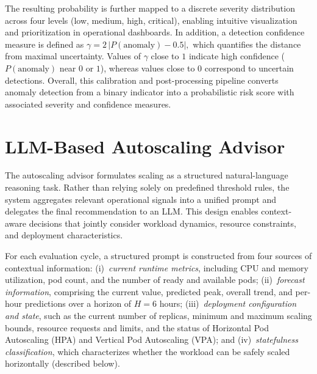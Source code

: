 \documentclass[sigconf]{acmart}
\begin{document}
The resulting probability is further mapped to a discrete severity distribution across four levels (low, medium, high, critical), enabling intuitive visualization and prioritization in operational dashboards.
In addition, a detection confidence measure is defined as $\gamma = 2\,\bigl|P(\text{anomaly}) - 0.5\bigr|,$
which quantifies the distance from maximal uncertainty. Values of $\gamma$ close to $1$ indicate high confidence ($P(\text{anomaly})$ near $0$ or $1$), whereas values close to $0$ correspond to uncertain detections.
%
Overall, this calibration and post-processing pipeline converts anomaly detection from a binary indicator into a probabilistic risk score with associated severity and confidence measures.

\section{LLM-Based Autoscaling Advisor}
\label{sec:llm}

The autoscaling advisor formulates scaling as a structured natural-language reasoning task. Rather than relying solely on predefined threshold rules, the system aggregates relevant operational signals into a unified prompt and delegates the final recommendation to an LLM. This design enables context-aware decisions that jointly consider workload dynamics, resource constraints, and deployment characteristics.

For each evaluation cycle, a structured prompt is constructed from four sources of contextual information:
(i)~\emph{current runtime metrics}, including CPU and memory utilization, pod count, and the number of ready and available pods;
(ii)~\emph{forecast information}, comprising the current value, predicted peak, overall trend, and per-hour predictions over a horizon of $H = 6$ hours;
(iii)~\emph{deployment configuration and state}, such as the current number of replicas, minimum and maximum scaling bounds, resource requests and limits, and the status of Horizontal Pod Autoscaling (HPA) and Vertical Pod Autoscaling (VPA); and
(iv)~\emph{statefulness classification}, which characterizes whether the workload can be safely scaled horizontally (described below).
\end{document}
